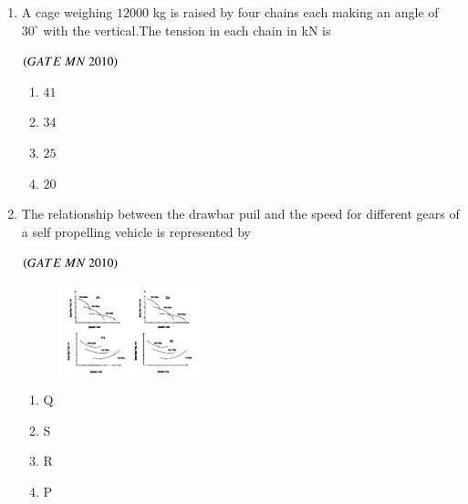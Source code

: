 \documentclass{article}
\begin{document}
\begin{enumerate}[label=Q.\arabic*., itemsep=1em, leftmargin=0pt, itemindent=*, labelsep=0.5em]
\begin{enumerate}[label=Q.\arabic*., start=17, leftmargin=2em]
\begin{multicols}{2}
\begin{enumerate}[label=(\Alph*),leftmargin=1em]
\item  1-a; 2-c; 3-d; 4-b  
\item 1-c; 2-b; 3-d; 4-a  
\item  1-d; 2-a; 3-d; 4-c  
\item 1-d; 2-c; 3-b; 4-a
  
\end{enumerate}
\end{multicols}
\bigskip
\item A cage weighing $12000$ kg is raised by four chains each making an angle of $30^\circ$ with the vertical.The tension in each chain in kN is
\\
\begin{flushright}
\hfill$\left(GATE\ MN\ 2010\right)$
\end{flushright}
\begin{multicols}{4}
\begin{enumerate}[label=(\Alph*),leftmargin=4em]
\item $ 41$
\item $34$
\item $25$
\item $20$
\end{enumerate}
\end{multicols}
\bigskip
\item The relationship between the drawbar puil and the speed for different gears of a self propelling
vehicle is represented by
\\
\begin{flushright}
\hfill$\left(GATE\ MN\ 2010\right)$
\end{flushright}
\begin{figure}[h!]
\centering
\includegraphics[width=0.4\textwidth]{figs/graphs.png} 
\end{figure}
\begin{multicols}{4}
\begin{enumerate}[label=(\Alph*),leftmargin=4em]
\item Q
\item S
\item R
\item P
\end{enumerate}
\end{multicols}
\bigskip

\end{enumerate}
\end{enumerate}
\end{document}
